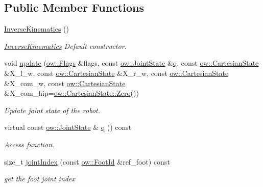 \subsection*{Public Member Functions}
\begin{DoxyCompactItemize}
\item 
\hyperlink{classow__ik_1_1InverseKinematics_a24a9e26049e403f613316a85a698ec90}{Inverse\+Kinematics} ()\hypertarget{classow__ik_1_1InverseKinematics_a24a9e26049e403f613316a85a698ec90}{}\label{classow__ik_1_1InverseKinematics_a24a9e26049e403f613316a85a698ec90}

\begin{DoxyCompactList}\small\item\em \hyperlink{classow__ik_1_1InverseKinematics}{Inverse\+Kinematics} Default constructor. \end{DoxyCompactList}\item 
void \hyperlink{classow__ik_1_1InverseKinematics_a69c5a3ee0e7c5d5543f834b9b06a5f34}{update} (\hyperlink{classow__core_1_1Flags}{ow\+::\+Flags} \&flags, const \hyperlink{classow__core_1_1JointState}{ow\+::\+Joint\+State} \&\hyperlink{classow__ik_1_1InverseKinematics_a5b2e482a9c26e81791e25b947bcb33df}{q}, const \hyperlink{classow__core_1_1CartesianState}{ow\+::\+Cartesian\+State} \&X\+\_\+l\+\_\+w, const \hyperlink{classow__core_1_1CartesianState}{ow\+::\+Cartesian\+State} \&X\+\_\+r\+\_\+w, const \hyperlink{classow__core_1_1CartesianState}{ow\+::\+Cartesian\+State} \&X\+\_\+com\+\_\+w, const \hyperlink{classow__core_1_1CartesianState}{ow\+::\+Cartesian\+State} \&X\+\_\+com\+\_\+hip=\hyperlink{classow__core_1_1StateBase_a82b3a22c15f7c57ad31a0453fcef7428}{ow\+::\+Cartesian\+State\+::\+Zero}())
\begin{DoxyCompactList}\small\item\em Update joint state of the robot. \end{DoxyCompactList}\item 
virtual const \hyperlink{classow__core_1_1JointState}{ow\+::\+Joint\+State} \& \hyperlink{classow__ik_1_1InverseKinematics_a5b2e482a9c26e81791e25b947bcb33df}{q} () const 
\begin{DoxyCompactList}\small\item\em Access function. \end{DoxyCompactList}\item 
size\+\_\+t \hyperlink{classow__ik_1_1InverseKinematics_a48fe4dc9381542618bbcaf7f8ed74057}{joint\+Index} (const \hyperlink{foot__id_8h_a57e66d30579b22cfe2c17c739278e5a6}{ow\+::\+Foot\+Id} \&ref\+\_\+foot) const \hypertarget{classow__ik_1_1InverseKinematics_a48fe4dc9381542618bbcaf7f8ed74057}{}\label{classow__ik_1_1InverseKinematics_a48fe4dc9381542618bbcaf7f8ed74057}

\begin{DoxyCompactList}\small\item\em get the foot joint index \end{DoxyCompactList}\end{DoxyCompactItemize}
